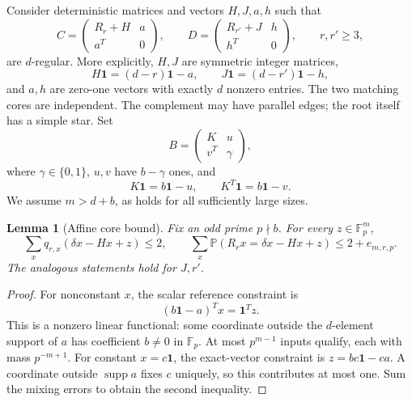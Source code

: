 \documentclass[11pt]{article}
\newtheorem{lemma}{Lemma}
\newcommand{\Fp}{\mathbb F_p}
\newcommand{\one}{\mathbf1}
\newcommand{\Prb}{\mathbb P}
\begin{document}
Consider deterministic matrices and vectors $H,J,a,h$ such that
\[
 C=\begin{pmatrix}R_r+H&a\\a^T&0\end{pmatrix},\qquad
 D=\begin{pmatrix}R_{r'}+J&h\\h^T&0\end{pmatrix},
 \qquad r,r'\ge3,
\]
are $d$-regular. More explicitly, $H,J$ are symmetric integer matrices,
\[
 H\one=(d-r)\one-a,\qquad J\one=(d-r')\one-h,
\]
and $a,h$ are zero-one vectors with exactly $d$ nonzero entries. The
two matching cores are independent. The complement may have parallel
edges; the root itself has a simple star. Set
\[
 B=\begin{pmatrix}K&u\\v^T&\gamma\end{pmatrix},
\]
where $\gamma\in\{0,1\}$, $u,v$ have $b-\gamma$ ones, and
\[
 K\one=b\one-u,\qquad K^T\one=b\one-v.
\]
We assume $m>d+b$, as holds for all sufficiently large sizes.

\begin{lemma}[Affine core bound]\label{lem:affine}
Fix an odd prime $p\nmid b$. For every $z\in\Fp^m$,
\[
 \sum_xq_{r,x}(\delta x-Hx+z)\le2,
 \qquad
 \sum_x\Prb(R_rx=\delta x-Hx+z)\le2+e_{m,r,p}.
\]
The analogous statements hold for $J,r'$.
\end{lemma}
\begin{proof}
For nonconstant $x$, the scalar reference constraint is
\[
 (b\one-a)^Tx=\one^Tz.
\]
This is a nonzero linear functional: some coordinate outside the
$d$-element support of $a$ has coefficient $b\ne0$ in $\Fp$.
At most $p^{m-1}$ inputs qualify, each with mass $p^{-m+1}$.
For constant $x=c\one$, the exact-vector constraint is
$z=bc\one-ca$. A coordinate outside $\operatorname{supp}a$ fixes
$c$ uniquely, so this contributes at most one. Sum the mixing errors
to obtain the second inequality.
\end{proof}
\end{document}
